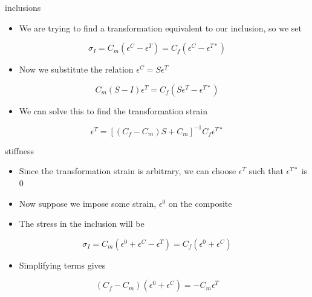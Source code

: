 \documentclass[
  letterpaper,
  ignorenonframetext,
  aspectratio=43,
  handout,
  12pt]{beamer}
\providecommand{\tightlist}{%
  \setlength{\itemsep}{0pt}\setlength{\parskip}{0pt}}
\providecommand{\tightlist}{%
\setlength{\itemsep}{0pt}\setlength{\parskip}{0pt}}
\begin{document}
\begin{frame}{inclusions}
\protect\hypertarget{inclusions-1}{}
\begin{itemize}
\tightlist
\item
  We are trying to find a transformation equivalent to our inclusion, so
  we set
\end{itemize}

\[\sigma_I = C_m(\epsilon^C - \epsilon^T) = C_f(\epsilon^C-\epsilon^{T*})\]

\begin{itemize}
\tightlist
\item
  Now we substitute the relation \(\epsilon^C = S\epsilon^T\)
\end{itemize}

\[C_m(S - I)\epsilon^T = C_f(S \epsilon^T-\epsilon^{T*})\]

\begin{itemize}
\tightlist
\item
  We can solve this to find the transformation strain
\end{itemize}

\[\epsilon^T = \left [ (C_f - C_m)S + C_m\right]^{-1} C_f \epsilon^{T*}\]
\end{frame}

\begin{frame}{stiffness}
\protect\hypertarget{stiffness}{}
\begin{itemize}
\tightlist
\item
  Since the transformation strain is arbitrary, we can choose
  \(\epsilon^T\) such that \(\epsilon^{T*}\) is 0
\item
  Now suppose we impose some strain, \(\epsilon^0\) on the composite
\item
  The stress in the inclusion will be
\end{itemize}

\[\sigma_I = C_m (\epsilon^0 + \epsilon^C - \epsilon^T) = C_f (\epsilon^0 + \epsilon^C)\]

\begin{itemize}
\tightlist
\item
  Simplifying terms gives
\end{itemize}

\[\left ( C_f - C_m \right ) \left ( \epsilon^0 + \epsilon^C \right) = -C_m \epsilon^T\]
\end{frame}
\end{document}
